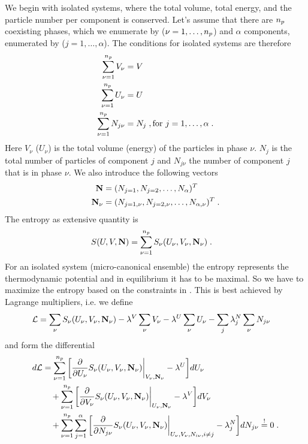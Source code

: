 We begin with isolated systems, where the total volume, total  energy, and the particle number per component is conserved. Let's assume that there are $n_{p} $ coexisting phases, which we enumerate by
($\nu=1,\ldots,n_{p} $) and $\alpha$ components, enumerated by ($j=1,\ldots,\alpha$).
The conditions for isolated systems are therefore
\begin{subequations}\label{eq:constraints}
\begin{align}
\sum_{\nu=1}^{n_{p} } V_{\nu} &= V\\
\sum_{\nu=1}^{n_{p} } U_{\nu} &= U\\
\sum_{\nu=1}^{n_{p} } N_{j\nu} &= N_{j}\;,\text{for } j=1,\ldots, \alpha\;.
\label{eq:constraints:c}
\end{align}
\end{subequations}
Here $V_{\nu}$ ($U_{\nu}$) is the total volume (energy) of the  particles in phase $\nu$.
$N_{j}$ is the total number of particles of component $j$ and $N_{j\nu}$ the number of component
$j$ that is in phase $\nu$. We also introduce the following vectors
%
\begin{align}\label{def:N}
\mathbf N &= (N_{j=1},N_{j=2},\ldots,N_{\alpha})^{T}\\
\mathbf N_{\nu} &= (N_{j=1,\nu},N_{j=2,\nu},\ldots,N_{\alpha,\nu})^{T}\;.
\end{align}
%
The entropy as extensive quantity is 
%
\begin{align}\label{eq:}
S(U,V,\mathbf N) &= \sum_{\nu=1}^{n_{p} } S_{\nu}(U_{\nu},V_{\nu},\mathbf N_{\nu})\;.
\end{align}
%
For an isolated system (micro-canonical ensemble) the entropy represents the thermodynamic
potential and in equilibrium it has to be maximal. So we have to maximize the entropy based on
the constraints in . This is best achieved by Lagrange multipliers, i.e. we define
%
\begin{align}\label{eq:}
{\cal L} &= \sum_{\nu} S_{\nu}(U_{\nu},V_{\nu},\mathbf N_{\nu})
-\lambda^{V} \sum_{\nu} V_{\nu}
-\lambda^{U} \sum_{\nu} U_{\nu}
-\sum_{j}\lambda^{N}_{j}\sum_{\nu} N_{j\nu}
\end{align}
%
and form the differential
\begin{subequations}\label{eq:}
\begin{align}
d{\cal L} &= \sum_{\nu=1}^{n_{p} } 
\bigg[\frac{\partial }{\partial U_{\nu}}S_{\nu}(U_{\nu},V_{\nu},\mathbf N_{\nu})\bigg|_{V_{\nu},\mathbf N_{\nu}} -\lambda^{U}\bigg]dU_{\nu}\\
&\quad +\sum_{\nu=1}^{n_{p} } \bigg[\frac{\partial }{\partial V_{\nu}}S_{\nu}(U_{\nu},V_{\nu},\mathbf N_{\nu})\bigg|_{U_{\nu},\mathbf N_{\nu}} -\lambda^{V}\bigg]dV_{\nu}\\
&\quad +\sum_{\nu=1}^{n_{p} } \sum_{j=1}^{\alpha}\bigg[\frac{\partial }{\partial N_{j\nu}}S_{\nu}(U_{\nu},V_{\nu},\mathbf N_{\nu}) \bigg|_{U_{\nu},V_{\nu},N_{i\nu},i\ne j}-\lambda^{N}_{j}\bigg]dN_{j\nu}
\overset{!}{=}0\;.
\end{align}
\end{subequations}

